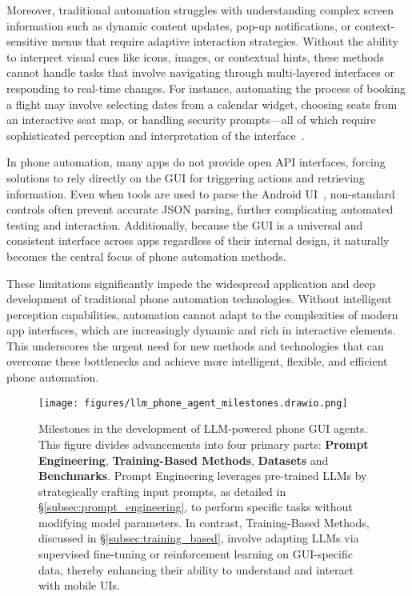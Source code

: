 Moreover, traditional automation struggles with understanding complex screen information such as dynamic content updates, pop-up notifications, or context-sensitive menus that require adaptive interaction strategies. Without the ability to interpret visual cues like icons, images, or contextual hints, these methods cannot handle tasks that involve navigating through multi-layered interfaces or responding to real-time changes. For instance, automating the process of booking a flight may involve selecting dates from a calendar widget, choosing seats from an interactive seat map, or handling security prompts—all of which require sophisticated perception and interpretation of the interface~\cite{zhang2024llamatouch}.

In phone automation, many apps do not provide open API interfaces, forcing solutions to rely directly on the GUI for triggering actions and retrieving information. Even when tools are used to parse the Android UI~\cite{wu2021screen}, non-standard controls often prevent accurate JSON parsing, further complicating automated testing and interaction. Additionally, because the GUI is a universal and consistent interface across apps regardless of their internal design, it naturally becomes the central focus of phone automation methods.

These limitations significantly impede the widespread application and deep development of traditional phone automation technologies. Without intelligent perception capabilities, automation cannot adapt to the complexities of modern app interfaces, which are increasingly dynamic and rich in interactive elements. This underscores the urgent need for new methods and technologies that can overcome these bottlenecks and achieve more intelligent, flexible, and efficient phone automation.

\begin{figure*}[!ht]
\centering
\texttt{[image: figures/llm\_phone\_agent\_milestones.drawio.png]}
\caption{Milestones in the development of LLM-powered phone GUI agents. This figure divides advancements into four primary parts: \textbf{Prompt Engineering},  \textbf{Training-Based Methods}, \textbf{Datasets} and \textbf{Benchmarks}. Prompt Engineering leverages pre-trained LLMs by strategically crafting input prompts, as detailed in \S\ref{subsec:prompt_engineering}, to perform specific tasks without modifying model parameters. In contrast, Training-Based Methods, discussed in \S\ref{subsec:training_based}, involve adapting LLMs via supervised fine-tuning or reinforcement learning on GUI-specific data, thereby enhancing their ability to understand and interact with mobile UIs.}
\label{fig:llm_phone_agent_milestones}
\end{figure*}

